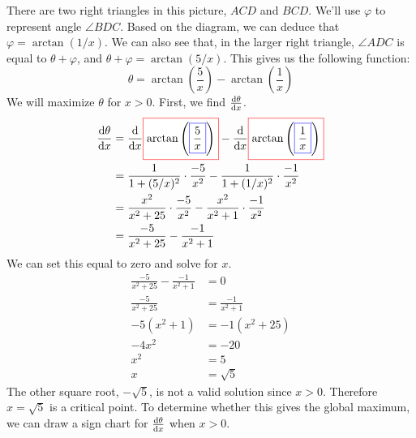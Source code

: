 \documentclass[main]{subfiles}
\begin{document}
\begin{enumerate}
\begin{solution}
    There are two right triangles in this picture, $ACD$ and $BCD$. 
    We'll use $\varphi$ to represent angle $\angle BDC$. Based on the
    diagram, we can deduce that $\varphi = \arctan(1/x)$. We can also
    see that, in the larger right triangle, $\angle ADC$ is equal to
    $\theta + \varphi$, and $\theta + \varphi = \arctan(5/x)$. This
    gives us the following function: 
    \[
        \theta = \arctan\left(\frac{5}{x}\right) - 
          \arctan\left(\frac{1}{x}\right)
    \]
    We will maximize $\theta$ for $x>0$. First, we find $\diff{\theta}{x}$.
    \begin{align*}
        \diff{\theta}{x} &= \diff*{\fcolorbox{red}{white}{$
          \arctan\left(\fcolorbox{blue}{white}{$\dfrac{5}{x}$}\right)$}}{x}
          - \diff*{\fcolorbox{red}{white}{$
          \arctan\left(\fcolorbox{blue}{white}{$\dfrac{1}{x}$}\right)$}}{x}
          \\
          &= \frac{1}{1+(5/x)^2} \cdot \frac{-5}{x^2} -
            \frac{1}{1+(1/x)^2} \cdot \frac{-1}{x^2}
          \\
          &= \frac{x^2}{x^2+25} \cdot \frac{-5}{x^2} -
             \frac{x^2}{x^2+1} \cdot \frac{-1}{x^2}
          \\
          &= \frac{-5}{x^2+25} - \frac{-1}{x^2+1}
    \end{align*}
    We can set this equal to zero and solve for $x$.
    \begin{align*}
        \frac{-5}{x^2+25} - \frac{-1}{x^2+1} &= 0 \\
        \frac{-5}{x^2+25} &= \frac{-1}{x^2+1} \\
        -5(x^2+1) &= -1(x^2+25) \\
        -4x^2 &= -20 \\
        x^2 &= 5 \\
        x &= \sqrt{5}
    \end{align*}
    The other square root, $-\sqrt{5}$, is not a valid solution since $x>0$.
    Therefore $x=\sqrt{5}$ is a critical point. To determine whether this
    gives the global maximum, we can draw a sign chart for 
    $\diff{\theta}{x}$ when $x>0$.
    \begin{center}
\end{center}
\end{solution}
\end{enumerate}
\end{document}
